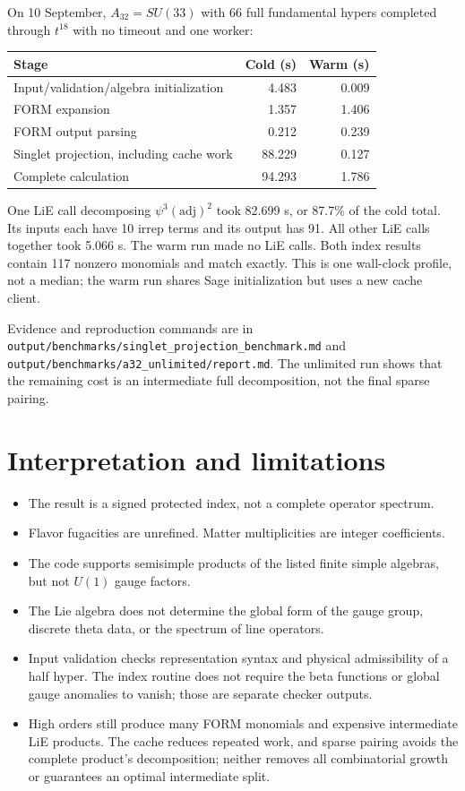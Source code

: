 \documentclass[11pt,a4paper]{article}
\newcommand{\code}[1]{{\small\nolinkurl{#1}}}
\newcommand{\adj}{\mathrm{adj}}
\begin{document}
On 10 September, $A_{32}=SU(33)$ with 66 full fundamental hypers completed through
$t^{18}$ with no timeout and one worker:
\begin{center}\begin{tabular}{lrr}
\toprule Stage & Cold (s) & Warm (s)\\\midrule
Input/validation/algebra initialization & 4.483 & 0.009\\
FORM expansion & 1.357 & 1.406\\
FORM output parsing & 0.212 & 0.239\\
Singlet projection, including cache work & 88.229 & 0.127\\
Complete calculation & 94.293 & 1.786\\\bottomrule
\end{tabular}\end{center}
One LiE call decomposing $\psi^3(\adj)^2$ took 82.699 s, or 87.7\% of the cold
total. Its inputs each have 10 irrep terms and its output has 91. All other LiE
calls together took 5.066 s. The warm run made no LiE calls. Both index results
contain 117 nonzero monomials and match exactly. This is one wall-clock profile,
not a median; the warm run shares Sage initialization but uses a new cache client.

Evidence and reproduction commands are in
\code{output/benchmarks/singlet_projection_benchmark.md} and
\code{output/benchmarks/a32_unlimited/report.md}. The unlimited run shows that the
remaining cost is an intermediate full decomposition, not the final sparse pairing.



\clearpage
\section{Interpretation and limitations}\label{sec:limits}
\begin{itemize}
\item The result is a signed protected index, not a complete operator spectrum.
\item Flavor fugacities are unrefined. Matter multiplicities are integer coefficients.
\item The code supports semisimple products of the listed finite simple algebras,
but not $U(1)$ gauge factors.
\item The Lie algebra does not determine the global form of the gauge group,
discrete theta data, or the spectrum of line operators.
\item Input validation checks representation syntax and physical admissibility
of a half hyper. The index routine does not require the beta functions or global
gauge anomalies to vanish; those are separate checker outputs.
\item High orders still produce many FORM monomials and expensive intermediate
LiE products. The cache reduces repeated work, and sparse pairing avoids the
complete product's decomposition; neither removes all combinatorial growth or
guarantees an optimal intermediate split.
\end{itemize}
\end{document}
